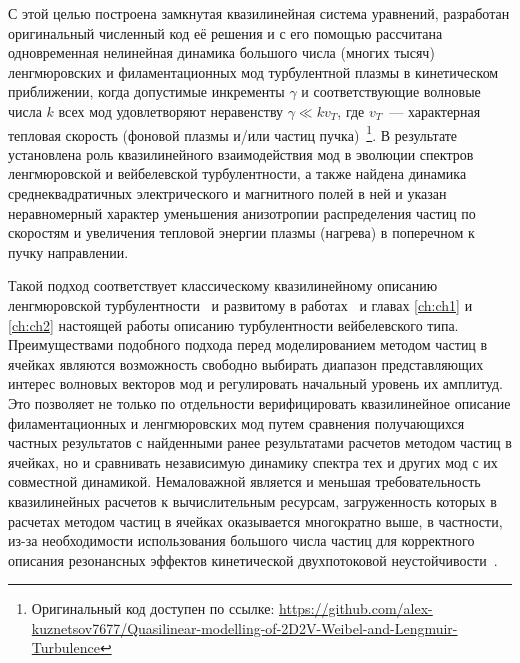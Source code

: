 С этой целью построена замкнутая квазилинейная система уравнений, разработан оригинальный численный код её решения и с его помощью рассчитана одновременная нелинейная динамика большого числа (многих тысяч) ленгмюровских и филаментационных мод турбулентной плазмы в кинетическом приближении, когда допустимые инкременты $\gamma$ и соответствующие волновые числа $k$ всех мод удовлетворяют неравенству $\gamma\ll kv_T$, где $v_T$~--- характерная тепловая скорость (фоновой плазмы и/или частиц пучка)~\footnote{Оригинальный код доступен по ссылке: \href{https://github.com/alex-kuznetsov7677/Quasilinear-modelling-of-2D2V-Weibel-and-Lengmuir-Turbulence}{https://github.com/alex-kuznetsov7677/Quasilinear-modelling-of-2D2V-Weibel-and-Lengmuir-Turbulence}}. В результате установлена роль квазилинейного взаимодействия мод в эволюции спектров ленгмюровской и вейбелевской турбулентности, а также найдена динамика среднеквадратичных электрического и магнитного полей в ней и указан неравномерный характер уменьшения анизотропии распределения частиц по скоростям и увеличения тепловой энергии плазмы (нагрева) в поперечном к пучку направлении.

Такой подход соответствует классическому квазилинейному описанию ленгмюровской турбулентности~\cite{VedenovRyutov1975,Appert1976,GaleevSagdeev1984,Bakunin2017} и развитому в работах~\cite{Davidson1972,Sadovskii2001,Pokhotelov2011,Ruyer2015,StockemNovo2015} и главах \ref{ch:ch1} и \ref{ch:ch2} настоящей работы описанию турбулентности вейбелевского типа. Преимуществами подобного подхода перед моделированием методом частиц в ячейках являются возможность свободно выбирать диапазон представляющих интерес волновых векторов мод и регулировать начальный уровень их амплитуд. Это позволяет не только по отдельности верифицировать квазилинейное описание филаментационных и ленгмюровских мод путем сравнения получающихся частных результатов с найденными ранее результатами расчетов методом частиц в ячейках, но и сравнивать независимую динамику спектра тех и других мод с их совместной динамикой. Немаловажной является и меньшая требовательность квазилинейных расчетов к вычислительным ресурсам, загруженность которых в расчетах методом частиц в ячейках оказывается многократно выше, в частности, из-за необходимости использования большого числа частиц для корректного описания резонансных эффектов кинетической двухпотоковой неустойчивости~\cite{Lotov2015,Ruyer2020,Zhang2022}.  

